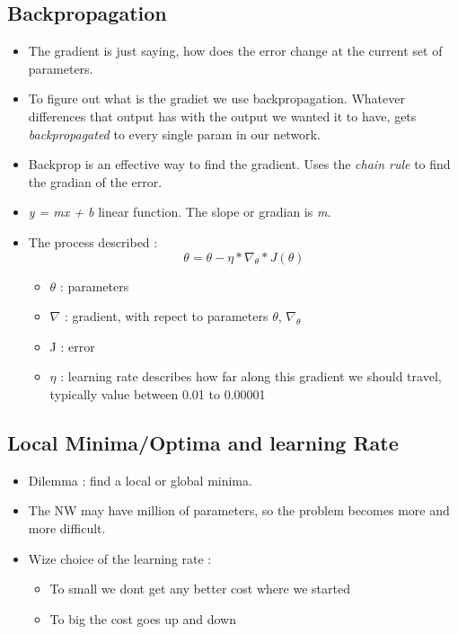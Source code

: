 \documentclass[12pt,a4paper]{article}
\begin{document}
\subsection{Backpropagation}
\begin{itemize}
\item  The gradient is just saying, how does the error change at the current set of parameters.
\item To figure out what is the gradiet we use backpropagation. Whatever differences that output has with the output we wanted it to have, gets \textit{backpropagated} to every single param in our network.
\item Backprop is an effective way to find the gradient. Uses the \textit{chain rule} to find the gradian of the error.
\item \textit{y = mx + b} linear function. The slope or gradian is \textit{m}.
\item The process described : 
\begin{equation} \theta = \theta - \eta * \nabla_\theta * J(\theta)
\end{equation}
\begin{itemize}
\item $\theta$ : parameters
\item $\nabla$ : gradient, with repect to parameters $\theta$, $\nabla_\theta$
\item J : error
\item $\eta$ : learning rate describes how far along this gradient we should travel, typically value between 0.01 to 0.00001
\end{itemize}
\end{itemize}
\subsection{Local Minima/Optima and learning Rate}
\begin{itemize}
\item Dilemma : find a local or global minima.
\item The NW may have million of parameters, so the problem becomes more and more difficult.
\item Wize choice of the learning rate : 
\begin{itemize}
\item To small we dont get any better cost where we started
\item To big the cost goes up and down
\end{itemize} 
\end{itemize}
\end{document}
